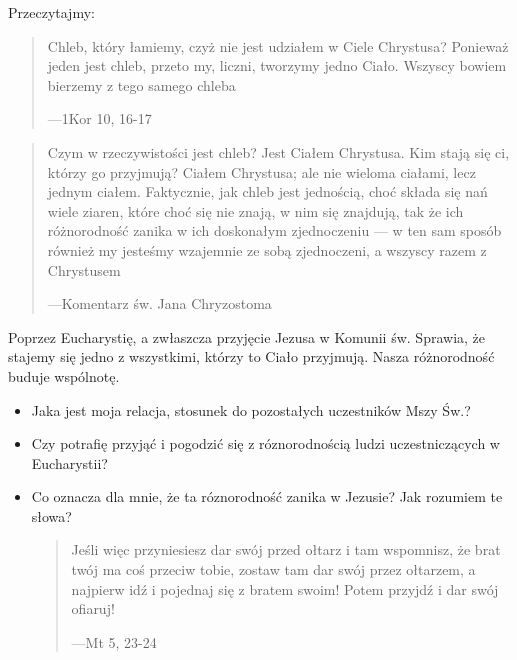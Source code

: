 \documentclass[a5paper,10pt,polish]{book}
\begin{document}
Przeczytajmy:
\begin{quote}

Chleb, który łamiemy, czyż nie jest udziałem w Ciele Chrystusa? Ponieważ jeden jest chleb, przeto my, liczni, tworzymy jedno Ciało. Wszyscy bowiem bierzemy z tego samego chleba

\begin{flushright}
---1Kor 10, 16-17
\end{flushright}
\end{quote}
\begin{quote}

Czym w rzeczywistości jest chleb? Jest Ciałem Chrystusa. Kim stają się ci, którzy go przyjmują? Ciałem Chrystusa; ale nie wieloma ciałami, lecz jednym ciałem. Faktycznie, jak chleb jest jednością, choć składa się nań wiele ziaren, które choć się nie znają, w nim się znajdują, tak że ich różnorodność zanika w ich doskonałym zjednoczeniu — w ten sam sposób również my jesteśmy wzajemnie ze sobą zjednoczeni, a wszyscy razem z Chrystusem

\begin{flushright}
---Komentarz św. Jana Chryzostoma
\end{flushright}
\end{quote}

Poprzez Eucharystię, a zwłaszcza przyjęcie Jezusa w Komunii św. Sprawia, że stajemy się jedno z wszystkimi, którzy to Ciało przyjmują. Nasza różnorodność buduje wspólnotę.
\begin{itemize}
\item {} 
Jaka jest moja relacja, stosunek do pozostałych uczestników Mszy Św.?

\item {} 
Czy potrafię przyjąć i pogodzić się z róznorodnością ludzi uczestniczących w Eucharystii?

\item {} 
Co oznacza dla mnie, że ta róznorodność zanika w Jezusie? Jak rozumiem te słowa?
\begin{quote}

Jeśli więc przyniesiesz dar swój przed ołtarz i tam wspomnisz, że brat twój ma coś przeciw tobie, zostaw tam dar swój przez ołtarzem, a najpierw idź i pojednaj się z bratem swoim! Potem przyjdź i dar swój ofiaruj!

\begin{flushright}
---Mt 5, 23-24
\end{flushright}
\end{quote}

\end{itemize}
\end{document}
